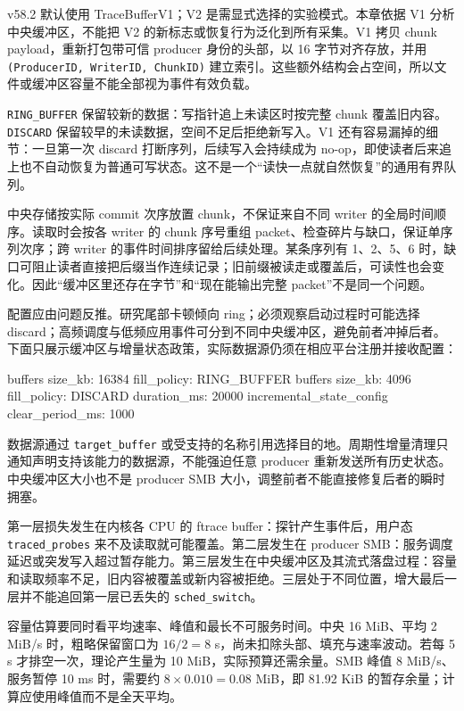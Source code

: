 \documentclass[UTF8,fontset=fandol,openany,11pt]{ctexbook}
\begin{document}
v58.2 默认使用 TraceBufferV1；V2 是需显式选择的实验模式。本章依据 V1 分析中央缓冲区，不能把 V2 的新标志或恢复行为泛化到所有采集。V1 拷贝 chunk payload，重新打包带可信 producer 身份的头部，以 16 字节对齐存放，并用 \texttt{(ProducerID,\allowbreak{} WriterID,\allowbreak{} ChunkID)} 建立索引。这些额外结构会占空间，所以文件或缓冲区容量不能全部视为事件有效负载。\cite{pf-config}\cite{pf-buffer-v1}


\texttt{RING\_\allowbreak{}BUFFER} 保留较新的数据：写指针追上未读区时按完整 chunk 覆盖旧内容。\texttt{DISCARD} 保留较早的未读数据，空间不足后拒绝新写入。V1 还有容易漏掉的细节：一旦第一次 discard 打断序列，后续写入会持续成为 no-op，即使读者后来追上也不自动恢复为普通可写状态。这不是一个“读快一点就自然恢复”的通用有界队列。\cite{pf-buffer-v1}


中央存储按实际 commit 次序放置 chunk，不保证来自不同 writer 的全局时间顺序。读取时会按各 writer 的 chunk 序号重组 packet、检查碎片与缺口，保证单序列次序；跨 writer 的事件时间排序留给后续处理。某条序列有 1、2、5、6 时，缺口可阻止读者直接把后缀当作连续记录；旧前缀被读走或覆盖后，可读性也会变化。因此“缓冲区里还存在字节”和“现在能输出完整 packet”不是同一个问题。\cite{pf-buffer-v1}


配置应由问题反推。研究尾部卡顿倾向 ring；必须观察启动过程时可能选择 discard；高频调度与低频应用事件可分到不同中央缓冲区，避免前者冲掉后者。下面只展示缓冲区与增量状态政策，实际数据源仍须在相应平台注册并接收配置：



\begin{codeblock}
buffers { size_kb: 16384 fill_policy: RING_BUFFER }
buffers { size_kb: 4096  fill_policy: DISCARD }
duration_ms: 20000
incremental_state_config { clear_period_ms: 1000 }
\end{codeblock}

数据源通过 \texttt{target\_\allowbreak{}buffer} 或受支持的名称引用选择目的地。周期性增量清理只通知声明支持该能力的数据源，不能强迫任意 producer 重新发送所有历史状态。中央缓冲区大小也不是 producer SMB 大小，调整前者不能直接修复后者的瞬时拥塞。\cite{pf-config}


第一层损失发生在内核各 CPU 的 ftrace buffer：探针产生事件后，用户态 \texttt{traced\_\allowbreak{}probes} 来不及读取就可能覆盖。第二层发生在 producer SMB：服务调度延迟或突发写入超过暂存能力。第三层发生在中央缓冲区及其流式落盘过程：容量和读取频率不足，旧内容被覆盖或新内容被拒绝。三层处于不同位置，增大最后一层并不能追回第一层已丢失的 \texttt{sched\_\allowbreak{}switch}。\cite{pf-buffers}


容量估算要同时看平均速率、峰值和最长不可服务时间。中央 16 MiB、平均 2 MiB/s 时，粗略保留窗口为 \(16/2=8\) s，尚未扣除头部、填充与速率波动。若每 5 s 才排空一次，理论产生量为 10 MiB，实际预算还需余量。SMB 峰值 8 MiB/s、服务暂停 10 ms 时，需要约 \(8\times0.010=0.08\) MiB，即 81.92 KiB 的暂存余量；计算应使用峰值而不是全天平均。\cite{pf-buffers}
\end{document}
